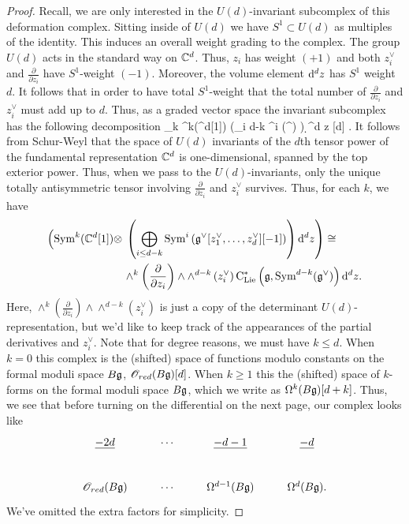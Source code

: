 \begin{proof}
Recall, we are only interested in the $U(d)$-invariant subcomplex of this deformation complex. 
Sitting inside of $U(d)$ we have $S^1 \subset U(d)$ as multiples of the identity. 
This induces an overall weight grading to the complex.
The group $U(d)$ acts in the standard way on $\mathbb C^d$.
Thus, $z_i$ has weight $(+1)$ and both $z_i^\vee$ and $\frac{\partial}{\partial z_i}$ have $S^1$-weight $(-1)$. 
Moreover, the volume element ${\rm d}^d z$ has $S^1$ weight $d$.
It follows that in order to have total $S^1$-weight that the total number of $\frac{\partial}{\partial z_i}$ and $z_i^\vee$ must add up to $d$.
Thus, as a graded vector space the invariant subcomplex has the following decomposition
\beqn
\bigoplus_k \Sym^k(\CC^d[1]) \tensor \left(\bigoplus_{i \leq d-k} \Sym^{i} \left(\fg^ \right) \right) \d^d z [d] .
\eeqn
It follows from Schur-Weyl that the space of $U(d)$ invariants of the $d$th tensor power of the fundamental representation $\mathbb C^d$ is one-dimensional, spanned by the top exterior power. 
Thus, when we pass to the $U(d)$-invariants, only the unique totally antisymmetric tensor involving $\frac{\partial}{\partial z_i}$ and $z_i^\vee$ survives. 
Thus, for each $k$, we have
\begin{align*}
\label{U(d) invariants}
\left({\rm Sym}^k(\mathbb C^d[1]) \otimes \right. & \left. \left(\bigoplus_{i \leq d-k} {\rm Sym}^{i} \left(\mathfrak g^\vee [z_1^\vee,\ldots,z_d^\vee][-1] \right) \right) {\rm d}^d z\right) \cong \\ & \wedge^{k}\left(\frac{\partial}{\partial z_i}\right) \wedge \wedge^{d-k}\left(z_i^\vee\right) {\rm C}_{{\rm Lie}}^*\left(\mathfrak g , {\rm Sym}^{d-k}(\mathfrak g^\vee)\right) {\rm d}^d z .
\end{align*}
Here, $\wedge^{k}\left(\frac{\partial}{\partial z_i}\right) \wedge \wedge^{d-k}\left(z_i^\vee\right)$ is just a copy of the determinant $U(d)$-representation, but we'd like to keep track of the appearances of the partial derivatives and $z_i^\vee$. 
Note that for degree reasons, we must have $k \leq d$. 
When $k = 0$ this complex is the (shifted) space of functions modulo constants on the formal moduli space $B\mathfrak g$, $\mathscr O_{red}(B\mathfrak g)[d]$. 
When $k \geq 1$ this the (shifted) space of $k$-forms on the formal moduli space $B\mathfrak g$, which we write as $\Omega^{k}(B \mathfrak g)[d+k]$.
Thus, we see that before turning on the differential on the next page, our complex looks like
\[
\label{bg def complex1}
\xymatrix{
\ul{-2d} & \cdots & \ul{-d-1} & \ul{-d} \\
\sO_{red}(B \fg) & \cdots & \Omega^{d-1} (B \fg) & \Omega^{d}(B \fg) .
}
\]
We've omitted the extra factors for simplicity. 


\end{proof}
